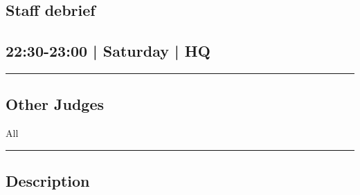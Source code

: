 \documentclass[10pt, A5]{article}
\begin{document}
		\begin{framed}
			\begin{minipage}{\textwidth}

			\setcounter{section}{87}
							\section{Staff debrief}
						
			\subsection*{22:30-23:00 | Saturday | HQ}

			\vspace{0.25cm}
			\hrule
			\vspace{0.25cm}


			\subsection*{Other Judges}
							All

					\vspace{0.25cm}
			\hrule
			\vspace{0.25cm}

			\begin{minipage}{\textwidth}
			\subsection*{\faListAlt \: Description}
			
			\end{minipage}


	\end{minipage}
	\end{framed}

	
\end{document}
